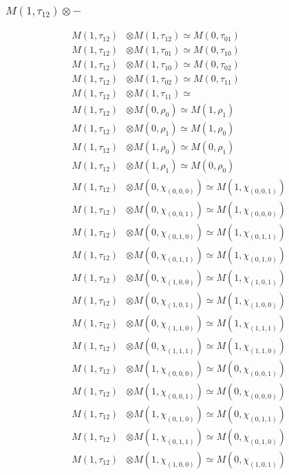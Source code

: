 \subsubsection{$ M(1,\tau_{12})\otimes -$}
\begin{align*}
M(1,\tau_{12}) &\otimes M(1,\tau_{12}) \simeq M(0,\tau_{01}) \\
M(1,\tau_{12}) &\otimes M(1,\tau_{01}) \simeq M(0,\tau_{10}) \\
M(1,\tau_{12}) &\otimes M(1,\tau_{10}) \simeq M(0,\tau_{02}) \\
M(1,\tau_{12}) &\otimes M(1,\tau_{02}) \simeq M(0,\tau_{11}) \\
M(1,\tau_{12}) &\otimes M(1,\tau_{11}) \simeq  \\
M(1,\tau_{12}) &\otimes M(0,\rho_{0}) \simeq M(1,\rho_{1}) \\
M(1,\tau_{12}) &\otimes M(0,\rho_{1}) \simeq M(1,\rho_{0}) \\
M(1,\tau_{12}) &\otimes M(1,\rho_{0}) \simeq M(0,\rho_{1}) \\
M(1,\tau_{12}) &\otimes M(1,\rho_{1}) \simeq M(0,\rho_{0}) \\
M(1,\tau_{12}) &\otimes M(0,\chi_{(0,0,0)}) \simeq M(1,\chi_{(0,0,1)}) \\
M(1,\tau_{12}) &\otimes M(0,\chi_{(0,0,1)}) \simeq M(1,\chi_{(0,0,0)}) \\
M(1,\tau_{12}) &\otimes M(0,\chi_{(0,1,0)}) \simeq M(1,\chi_{(0,1,1)}) \\
M(1,\tau_{12}) &\otimes M(0,\chi_{(0,1,1)}) \simeq M(1,\chi_{(0,1,0)}) \\
M(1,\tau_{12}) &\otimes M(0,\chi_{(1,0,0)}) \simeq M(1,\chi_{(1,0,1)}) \\
M(1,\tau_{12}) &\otimes M(0,\chi_{(1,0,1)}) \simeq M(1,\chi_{(1,0,0)}) \\
M(1,\tau_{12}) &\otimes M(0,\chi_{(1,1,0)}) \simeq M(1,\chi_{(1,1,1)}) \\
M(1,\tau_{12}) &\otimes M(0,\chi_{(1,1,1)}) \simeq M(1,\chi_{(1,1,0)}) \\
M(1,\tau_{12}) &\otimes M(1,\chi_{(0,0,0)}) \simeq M(0,\chi_{(0,0,1)}) \\
M(1,\tau_{12}) &\otimes M(1,\chi_{(0,0,1)}) \simeq M(0,\chi_{(0,0,0)}) \\
M(1,\tau_{12}) &\otimes M(1,\chi_{(0,1,0)}) \simeq M(0,\chi_{(0,1,1)}) \\
M(1,\tau_{12}) &\otimes M(1,\chi_{(0,1,1)}) \simeq M(0,\chi_{(0,1,0)}) \\
M(1,\tau_{12}) &\otimes M(1,\chi_{(1,0,0)}) \simeq M(0,\chi_{(1,0,1)}) \\

\end{align*}
